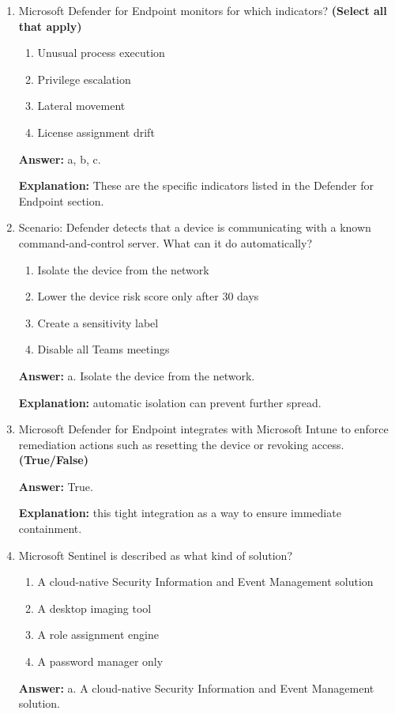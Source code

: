 \documentclass[10pt]{article}
\begin{document}
\begin{enumerate}[leftmargin=*]
\textbf{Explanation:} These three integrated tools are named in Phase 5.

\item Microsoft Defender for Endpoint monitors for which indicators? \textbf{(Select all that apply)}
\begin{enumerate}[label=\alph*., leftmargin=1.5em]
\item Unusual process execution
\item Privilege escalation
\item Lateral movement
\item License assignment drift
\end{enumerate}
\textbf{Answer:} a, b, c.

\textbf{Explanation:} These are the specific indicators listed in the Defender for Endpoint section.

\item Scenario: Defender detects that a device is communicating with a known command-and-control server. What can it do automatically?
\begin{enumerate}[label=\alph*., leftmargin=1.5em]
\item Isolate the device from the network
\item Lower the device risk score only after 30 days
\item Create a sensitivity label
\item Disable all Teams meetings
\end{enumerate}
\textbf{Answer:} a. Isolate the device from the network.

\textbf{Explanation:} automatic isolation can prevent further spread.

\item Microsoft Defender for Endpoint integrates with Microsoft Intune to enforce remediation actions such as resetting the device or revoking access. \textbf{(True/False)}

\textbf{Answer:} True.

\textbf{Explanation:} this tight integration as a way to ensure immediate containment.

\item Microsoft Sentinel is described as what kind of solution?
\begin{enumerate}[label=\alph*., leftmargin=1.5em]
\item A cloud-native Security Information and Event Management solution
\item A desktop imaging tool
\item A role assignment engine
\item A password manager only
\end{enumerate}
\textbf{Answer:} a. A cloud-native Security Information and Event Management solution.


\end{enumerate}
\end{document}
